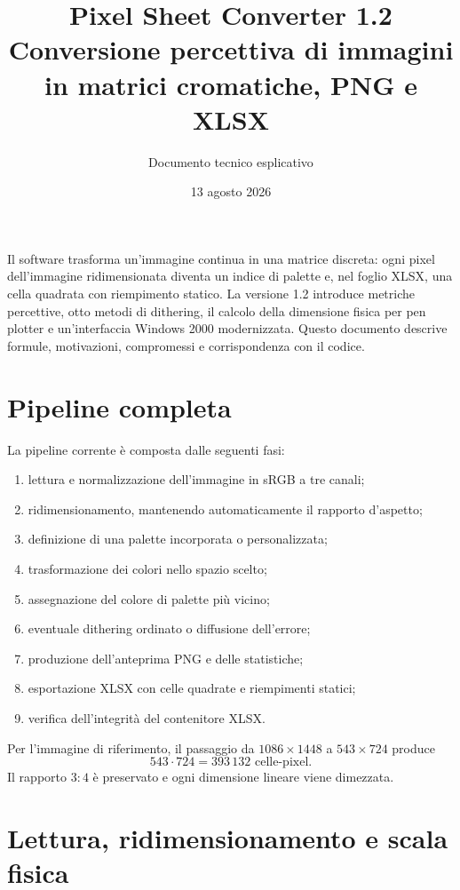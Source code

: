 \documentclass[11pt,a4paper]{article}
\title{\textbf{Pixel Sheet Converter 1.2}\\[4pt]\large Conversione percettiva di immagini in matrici cromatiche, PNG e XLSX}
\author{Documento tecnico esplicativo}
\date{13 agosto 2026}
\begin{document}
\maketitle
\begin{tcolorbox}[colback=lightblue,colframe=navy,title=Scopo del documento]
Il software trasforma un'immagine continua in una matrice discreta: ogni pixel dell'immagine ridimensionata diventa un indice di palette e, nel foglio XLSX, una cella quadrata con riempimento statico. La versione 1.2 introduce metriche percettive, otto metodi di dithering, il calcolo della dimensione fisica per pen plotter e un'interfaccia Windows 2000 modernizzata. Questo documento descrive formule, motivazioni, compromessi e corrispondenza con il codice.
\end{tcolorbox}
\tableofcontents
\newpage

\section{Pipeline completa}
La pipeline corrente è composta dalle seguenti fasi:
\begin{enumerate}[leftmargin=*,itemsep=2pt]
\item lettura e normalizzazione dell'immagine in sRGB a tre canali;
\item ridimensionamento, mantenendo automaticamente il rapporto d'aspetto;
\item definizione di una palette incorporata o personalizzata;
\item trasformazione dei colori nello spazio scelto;
\item assegnazione del colore di palette più vicino;
\item eventuale dithering ordinato o diffusione dell'errore;
\item produzione dell'anteprima PNG e delle statistiche;
\item esportazione XLSX con celle quadrate e riempimenti statici;
\item verifica dell'integrità del contenitore XLSX.
\end{enumerate}
Per l'immagine di riferimento, il passaggio da $1086\times1448$ a $543\times724$ produce
\[543\cdot724=393\,132\text{ celle-pixel}.\]
Il rapporto $3:4$ è preservato e ogni dimensione lineare viene dimezzata.

\section{Lettura, ridimensionamento e scala fisica}
\end{document}
